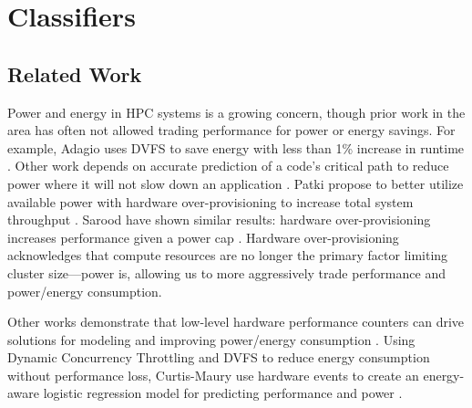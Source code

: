 \chapter{Classifiers}









\section{Related Work}


Power and energy in HPC systems is a growing concern, though prior work in the area has often not allowed trading performance for power or energy savings.
For example, Adagio uses DVFS to save energy with less than 1\% increase in runtime \cite{RountreeAdagio}.
Other work depends on accurate prediction of a code's critical path to reduce power where it will not slow down an application \cite{Jitter,Marathe2015}.
Patki \etal propose to better utilize available power with hardware over-provisioning to increase total system throughput \cite{PatkiRMAP}.
Sarood \etal have shown similar results: hardware over-provisioning increases performance given a power cap \cite{Sarood2013}.
Hardware over-provisioning acknowledges that compute resources are no longer the primary factor limiting cluster size---power is, allowing us to more aggressively trade performance and power/energy consumption.

Other works demonstrate that low-level hardware performance counters can drive solutions for modeling and improving power/energy consumption \cite{WuHPCComputer,Chetsa,Libutti2014,Sasaki}.
Using Dynamic Concurrency Throttling and DVFS to reduce energy consumption without performance loss, Curtis-Maury \etal use hardware events to create an energy-aware logistic regression model for predicting performance and power \cite{Curtis-Maury2008}.

